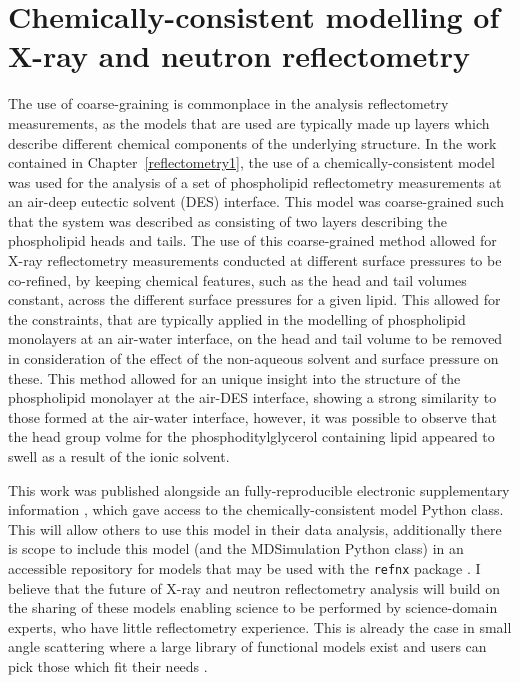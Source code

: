 \section{Chemically-consistent modelling of X-ray and neutron reflectometry}
The use of coarse-graining is commonplace in the analysis reflectometry measurements, as the models that are used are typically made up layers which describe different chemical components of the underlying structure.
In the work contained in Chapter~\ref{reflectometry1}, the use of a chemically-consistent model was used for the analysis of a set of phospholipid reflectometry measurements at an air-deep eutectic solvent (DES) interface.
This model was coarse-grained such that the system was described as consisting of two layers describing the phospholipid heads and tails.
The use of this coarse-grained method allowed for X-ray reflectometry measurements conducted at different surface pressures to be co-refined, by keeping chemical features, such as the head and tail volumes constant, across the different surface pressures for a given lipid.
This allowed for the constraints, that are typically applied in the modelling of phospholipid monolayers at an air-water interface, on the head and tail volume to be removed in consideration of the effect of the non-aqueous solvent and surface pressure on these.
This method allowed for an unique insight into the structure of the phospholipid monolayer at the air-DES interface, showing a strong similarity to those formed at the air-water interface, however, it was possible to observe that the head group volme for the phosphoditylglycerol containing lipid appeared to swell as a result of the ionic solvent.

This work was published alongside an fully-reproducible electronic supplementary information \cite{mccluskey_bayesian_2019,mccluskey_lipids_at_airdes_2019}, which gave access to the chemically-consistent model Python class.
This will allow others to use this model in their data analysis, additionally there is scope to include this model (and the MDSimulation Python class) in an accessible repository for models that may be used with the \texttt{refnx} package \cite{nelson_refnx_2019,nelson_refnx_2019-1,nelson_refnx-models_nodate}.
I believe that the future of X-ray and neutron reflectometry analysis will build on the sharing of these models enabling science to be performed by science-domain experts, who have little reflectometry experience.
This is already the case in small angle scattering where a large library of functional models exist and users can pick those which fit their needs \cite{noauthor_sasfit_nodate,noauthor_sasview_nodate}.


